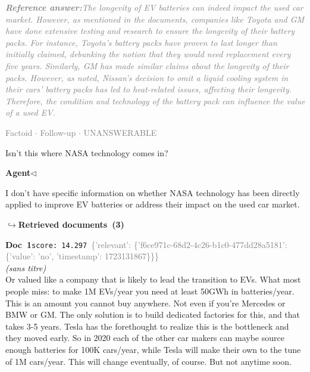 \documentclass[a4paper,11pt]{article}
\begin{document}
\begin{refanswerenv}
{\footnotesize\textit{\textcolor{gray}{\textbf{Reference answer:}\enspace The longevity of EV batteries can indeed impact the used car market. However, as mentioned in the documents, companies like Toyota and GM have done extensive testing and research to ensure the longevity of their battery packs. For instance, Toyota's battery packs have proven to last longer than initially claimed, debunking the notion that they would need replacement every five years. Similarly, GM has made similar claims about the longevity of their packs. However, as noted, Nissan's decision to omit a liquid cooling system in their cars' battery packs has led to heat-related issues, affecting their longevity. Therefore, the condition and technology of the battery pack can influence the value of a used EV.}}}
\end{refanswerenv}
\vspace{0.5em}
\hfill{\tiny\textcolor{gray}{Factoid $\cdot$ Follow-up $\cdot$ UNANSWERABLE}}
\begin{userbubble}
Isn't this where NASA technology comes in?
\end{userbubble}
\noindent\hfill{\small\textcolor{agentcolor}{\textbf{Agent\enspace$\triangleleft$}}}
\begin{agentbubble}
I don't have specific information on whether NASA technology has been directly applied to improve EV batteries or address their impact on the used car market.
\end{agentbubble}
\noindent\hfill{\footnotesize\textcolor{doccolor}{\textbf{$\hookrightarrow$\enspace Retrieved documents~(3)}}}
\begin{docenv}
{\footnotesize\textcolor{doccolor}{\textbf{Doc~1}}}\hfill{\tiny\texttt{score:~14.297}}\ {\tiny\textcolor{gray}{\{'relevant': \{'f6ce971c-68d2-4c26-b1c0-477dd28a5181': \{'value': 'no', 'timestamp': 1723131867\}\}\}}}\\[3pt]
{\small\textit{(sans titre)}}\\[2pt]
\vspace{2pt}
{\footnotesize 
Or valued like a company that is likely to lead the transition to EVs.  What most people miss: to make 1M EVs/year you need at least 50GWh in batteries/year. This is an amount you cannot buy anywhere. Not even if you're Mercedes or BMW or GM. The only solution is to build dedicated factories for this, and that takes 3-5 years.  Tesla has the forethought to realize this is the bottleneck and they moved early. So in 2020 each of the other car makers can maybe source enough batteries for 100K cars/year, while Tesla will make their own to the tune of 1M cars/year.  This will change eventually, of course. But not anytime soon.}
\end{docenv}
\end{document}
